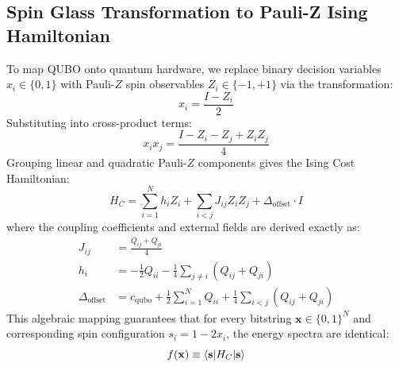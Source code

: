 \subsection{Spin Glass Transformation to Pauli-Z Ising Hamiltonian}
To map QUBO onto quantum hardware, we replace binary decision variables $x_i \in \{0, 1\}$ with Pauli-$Z$ spin observables $Z_i \in \{-1, +1\}$ via the transformation:
\begin{equation}
    x_i = \frac{I - Z_i}{2}
\end{equation}
Substituting into cross-product terms:
\begin{equation}
    x_i x_j = \frac{I - Z_i - Z_j + Z_i Z_j}{4}
\end{equation}
Grouping linear and quadratic Pauli-$Z$ components gives the Ising Cost Hamiltonian:
\begin{equation}
    H_C = \sum_{i=1}^N h_i Z_i + \sum_{i < j} J_{ij} Z_i Z_j + \Delta_{\text{offset}} \cdot I
\end{equation}
where the coupling coefficients and external fields are derived exactly as:
\begin{align}
    J_{ij} &= \frac{Q_{ij} + Q_{ji}}{4} \\
    h_i &= -\frac{1}{2} Q_{ii} - \frac{1}{4} \sum_{j \neq i} (Q_{ij} + Q_{ji}) \\
    \Delta_{\text{offset}} &= c_{\text{qubo}} + \frac{1}{2} \sum_{i=1}^N Q_{ii} + \frac{1}{4} \sum_{i < j} (Q_{ij} + Q_{ji})
\end{align}
This algebraic mapping guarantees that for every bitstring $\mathbf{x} \in \{0, 1\}^N$ and corresponding spin configuration $s_i = 1 - 2 x_i$, the energy spectra are identical:
\begin{equation}
    f(\mathbf{x}) \equiv \braket{\mathbf{s} | H_C | \mathbf{s}}
\end{equation}
